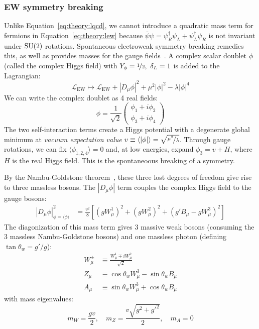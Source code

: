 \subsubsection{EW symmetry breaking}
Unlike Equation~\ref{eq:theory:lqcd}, we cannot introduce a quadratic mass term for fermions in Equation~\ref{eq:theory:lew} because $\bar\psi \psi = \psi^\dag_R\psi_L + \psi^\dag_L\psi_R$ is not invariant under $\operatorname{\mathrm{SU}}(2)$ rotations.
Spontaneous electroweak symmetry breaking remedies this, as well as provides masses for the gauge fields~\cite{ewsb1,ewsb2,ewsb3,ewsb4,ewsb5,ewsb6}.
A complex scalar doublet $\phi$ (called the complex Higgs field) with $Y_\phi=\nicefrac{1}{2},~\delta_L=1$ is added to the Lagrangian:
\begin{equation}
    \mathcal{L}_\mathrm{EW} \mapsto \mathcal{L}_\mathrm{EW}
            + |D_\mu \phi|^2 + \mu^2|\phi|^2 - \lambda |\phi|^4
    \label{eq:theory:lhiggs}
\end{equation}
We can write the complex doublet as 4 real fields:
\begin{equation}
    \phi = \frac{1}{\sqrt{2}} \left(\begin{matrix} \phi_1 + i\phi_2 \\ \phi_3 + i \phi_4 \end{matrix} \right)
\end{equation}
The two self-interaction terms create a Higgs potential with a degenerate global minimum at \emph{vacuum expectation value} $v \equiv \langle |\phi| \rangle = \sqrt{\nicefrac{\mu^2}{\lambda}}$.
Through gauge rotations, we can fix $\langle\phi_{1,2,4}\rangle = 0$ and, at low energies, expand $\phi_3 = v + H$, where $H$ is the real Higgs field. 
This is the spontaneoous breaking of a symmetry.

By the Nambu-Goldstone theorem~\cite{nambu,goldstone}, these three lost degrees of freedom give rise to three massless bosons. 
The $|D_\mu \phi|$ term couples the complex Higgs field to the gauge bosons:
\begin{align}
    |D_\mu \phi|^2_{\phi = \langle\phi\rangle} &= 
        \frac{v^2}{8} \left[(gW_\mu^1)^2 + (gW^2_\mu)^2 + (g'B_\mu - gW_\mu^3)^2\right] 
\end{align}
The diagonization of this mass term gives 3 massive weak bosons (consuming the 3 massless Nambu-Goldstone bosons) and one massless photon (defining $\tan\theta_w = g'/g$):
\begin{align}
    W^\pm_\mu &\equiv \frac{W_\mu^1 \mp iW_\mu^2}{\sqrt{2}} \nonumber \\ 
    Z_\mu &\equiv \cos\theta_w W_\mu^3 - \sin\theta_w B_\mu \nonumber \\ 
    A_\mu &\equiv \sin\theta_w W_\mu^3 + \cos\theta_w B_\mu
\end{align}
with mass eigenvalues:
\begin{equation}
    m_W = \frac{gv}{2}, \quad m_Z = \frac{v\sqrt{g^2+g'^2}}{2}, \quad m_A = 0
\end{equation}

